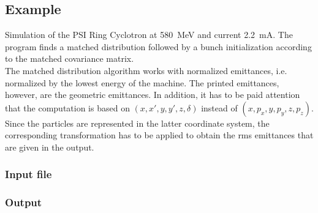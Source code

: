 \subsection{Example}
Simulation of the PSI Ring Cyclotron at \SI{580}{\mega\electronvolt} and current \SI{2.2}{\milli\ampere}. The program finds a matched
distribution followed by a bunch initialization according to the matched covariance matrix.\\
The matched distribution algorithm works with normalized emittances, i.e. normalized by the lowest energy of the
machine. The printed emittances, however, are the geometric emittances. In addition, it has to
be paid attention that the computation is based on $(x,x',y,y',z,\delta)$ instead of $(x,p_{x},y,p_{y},z,p_{z})$. Since
the particles are represented in the latter coordinate system, the corresponding transformation has to be applied to
obtain the rms emittances that are given in the output.
\subsubsection{Input file}
\subsubsection{Output}


